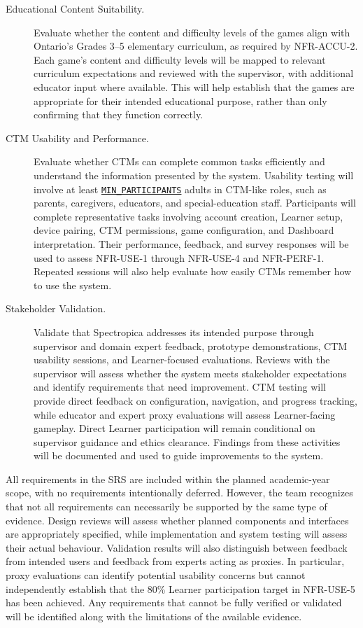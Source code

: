 \documentclass[12pt, titlepage]{article}
\newcommand{\paramref}[2]{\hyperlink{param:#1}{\texttt{#2}}}
\begin{document}
\begin{description}
  \item[Educational Content Suitability.] Evaluate whether the content and difficulty levels of the games align with Ontario's Grades 3--5 elementary curriculum, as required by NFR-ACCU-2. Each game's content and difficulty levels will be mapped to relevant curriculum expectations and reviewed with the supervisor, with additional educator input where available. This will help establish that the games are appropriate for their intended educational purpose, rather than only confirming that they function correctly.

  \item[CTM Usability and Performance.] Evaluate whether CTMs can complete common tasks efficiently and understand the information presented by the system. Usability testing will involve at least \paramref{min-participants}{MIN\_PARTICIPANTS} adults in CTM-like roles, such as parents, caregivers, educators, and special-education staff. Participants will complete representative tasks involving account creation, Learner setup, device pairing, CTM permissions, game configuration, and Dashboard interpretation. Their performance, feedback, and survey responses will be used to assess NFR-USE-1 through NFR-USE-4 and NFR-PERF-1. Repeated sessions will also help evaluate how easily CTMs remember how to use the system.

  \item[Stakeholder Validation.] Validate that Spectropica addresses its intended purpose through supervisor and domain expert feedback, prototype demonstrations, CTM usability sessions, and Learner-focused evaluations. Reviews with the supervisor will assess whether the system meets stakeholder expectations and identify requirements that need improvement. CTM testing will provide direct feedback on configuration, navigation, and progress tracking, while educator and expert proxy evaluations will assess Learner-facing gameplay. Direct Learner participation will remain conditional on supervisor guidance and ethics clearance. Findings from these activities will be documented and used to guide improvements to the system.

\end{description}

All requirements in the SRS are included within the planned academic-year scope, with no requirements intentionally deferred. However, the team recognizes that not all requirements can necessarily be supported by the same type of evidence. Design reviews will assess whether planned components and interfaces are appropriately specified, while implementation and system testing will assess their actual behaviour. Validation results will also distinguish between feedback from intended users and feedback from experts acting as proxies. In particular, proxy evaluations can identify potential usability concerns but cannot independently establish that the 80\% Learner participation target in NFR-USE-5 has been achieved. Any requirements that cannot be fully verified or validated will be identified along with the limitations of the available evidence.
\end{document}
